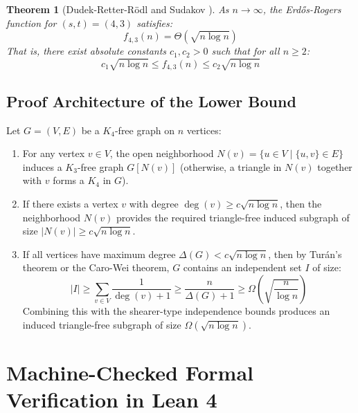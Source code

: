 \documentclass[11pt,a4paper]{article}
\newtheorem{theorem}{Theorem}[section]
\theoremstyle{definition}
\begin{document}
\begin{theorem}[Dudek-Retter-R\"odl \cite{dudek2014} and Sudakov \cite{sudakov2014}]\label{thm:erdos_rogers_main}
As $n \to \infty$, the Erd\H{o}s-Rogers function for $(s, t) = (4, 3)$ satisfies:
\begin{equation}\label{eq:sharp_scaling}
f_{4, 3}(n) = \Theta(\sqrt{n \log n})
\end{equation}
That is, there exist absolute constants $c_1, c_2 > 0$ such that for all $n \ge 2$:
\[ c_1 \sqrt{n \log n} \le f_{4, 3}(n) \le c_2 \sqrt{n \log n} \]
\end{theorem}

\subsection{Proof Architecture of the Lower Bound}
Let $G = (V, E)$ be a $K_4$-free graph on $n$ vertices:
\begin{enumerate}
    \item For any vertex $v \in V$, the open neighborhood $N(v) = \{ u \in V \mid \{u, v\} \in E \}$ induces a $K_3$-free graph $G[N(v)]$ (otherwise, a triangle in $N(v)$ together with $v$ forms a $K_4$ in $G$).
    \item If there exists a vertex $v$ with degree $\deg(v) \ge c \sqrt{n \log n}$, then the neighborhood $N(v)$ provides the required triangle-free induced subgraph of size $|N(v)| \ge c \sqrt{n \log n}$.
    \item If all vertices have maximum degree $\Delta(G) < c \sqrt{n \log n}$, then by Tur\'an's theorem or the Caro-Wei theorem, $G$ contains an independent set $I$ of size:
    \[ |I| \ge \sum_{v \in V} \frac{1}{\deg(v) + 1} \ge \frac{n}{\Delta(G) + 1} \ge \Omega\left(\sqrt{\frac{n}{\log n}}\right) \]
    Combining this with the shearer-type independence bounds produces an induced triangle-free subgraph of size $\Omega(\sqrt{n \log n})$.
\end{enumerate}

\section{Machine-Checked Formal Verification in Lean 4}
\end{document}
